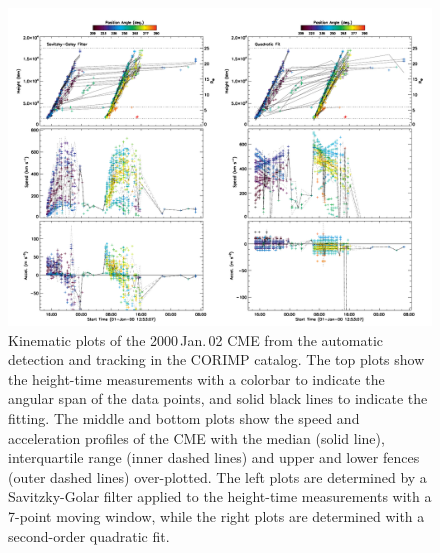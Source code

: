 \documentclass[referee,a4paper,12pt,traditabstract]{swsc}
\begin{document}
\begin{linenumbers}
\begin{figure}[t]
\centerline{\includegraphics[width=\linewidth]{images/20000102_corimp_kinspd.pdf}}
\caption{Kinematic plots of the 2000\,Jan.\,02 CME from the automatic detection and tracking in the CORIMP catalog. The top plots show the height-time measurements with a colorbar to indicate the angular span of the data points, and solid black lines to indicate the fitting. The middle and bottom plots show the speed and acceleration profiles of the CME with the median (solid line), interquartile range (inner dashed lines) and upper and lower fences (outer dashed lines) over-plotted. The left plots are determined by a Savitzky-Golar filter applied to the height-time measurements with a 7-point moving window, while the right plots are determined with a second-order quadratic fit.}
\label{20000102_corimp_kinspd}
\end{figure}


\end{linenumbers}
\end{document}
